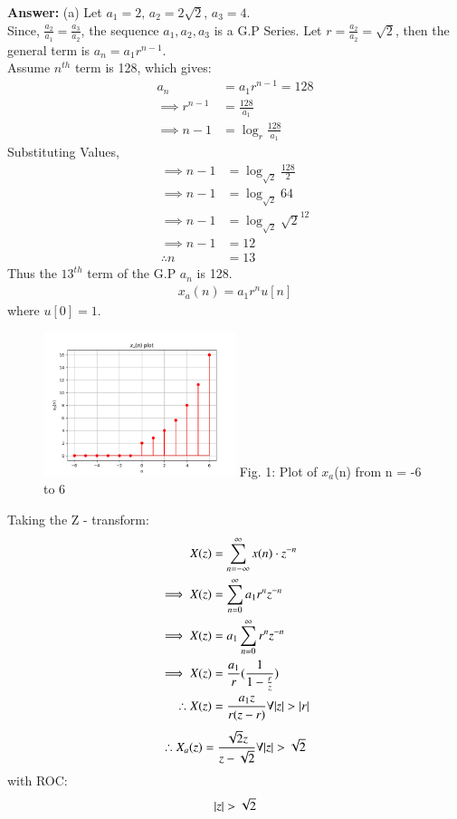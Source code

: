 \documentclass[journal,12pt,twocolumn]{IEEEtran}
\theoremstyle{remark}
\begin{document}
\textbf{Answer:} (a) Let $a_1 = 2$, $a_2 = 2\sqrt{2}$, $a_3 = 4$.\\
Since, $\frac{a_2}{a_1} = \frac{a_3}{a_2}$, the sequence $a_1, a_2, a_3$ is a G.P Series.
Let $r = \frac{a_2}{a_2} = \sqrt{2}$, then the general term is $a_n = a_1 r^{n-1}$.\\
Assume $n^{th}$ term is 128, which gives: 
\begin{align}
    a_n &= a_1 r^{n-1} = 128\\
    \implies r^{n-1} &= \frac{128}{a_1}\\
    \implies n - 1 &= \log_{r}{\frac{128}{a_1}}
\end{align}
Substituting Values,
\begin{align}
    \implies n - 1 &= \log_{\sqrt{2}}{\frac{128}{2}}\\
    \implies n - 1 &= \log_{\sqrt{2}}{64}\\
    \implies n - 1 &= \log_{\sqrt{2}}{\sqrt{2}^{12}}\\
    \implies n - 1 &= 12\\
    \therefore n &= 13
\end{align}
Thus the $13^{th}$ term of the G.P $a_n$ is 128.\\ 
\begin{align}  x_a(n) = a_1r^{n}u[n]  \end{align} where $u[0] = 1$.
\begin{figure}[h!]
    \centering
    \includegraphics[width=0.5\textwidth]{figs/a.png}
    Fig. 1: Plot of $x_a$(n) from n = -6 to 6
    \label{fig:img1}
\end{figure}
Taking the Z - transform:
\begin{align}
    X(z) &= \sum_{n = -\infty}^{\infty}{x(n) \cdot z^{-n}}\\
    \implies X(z) &= \sum_{n = 0}^{\infty}{a_1r^{n}z^{-n}}\\
    \implies X(z) &= a_1\sum_{n = 0}^{\infty}{r^n z^{-n}}\\
    \implies X(z) &= \frac{a_1}{r}(\frac{1}{1 - \frac{r}{z}})\\
    \therefore X(z) &= \frac{a_1z}{r(z - r)} \forall {\left\vert z\right\vert > \left\vert r\right\vert} \label{zresult}
\end{align}
\begin{align}
    \therefore X_a(z) = \frac{\sqrt{2}z}{z - \sqrt{2}}\forall {\left\vert z\right\vert > \sqrt{2}}
\end{align}
with ROC: \[ \left\vert z\right\vert > \sqrt{2} \]
\end{document}
